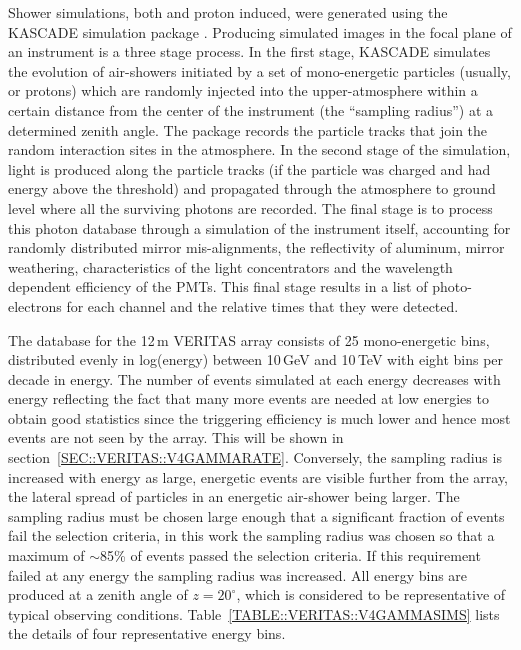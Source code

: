 Shower simulations, both \Gray and proton induced, were generated
using the KASCADE simulation package \citep{REF::KERTZMAN::1994NIMA}.
Producing simulated images in the focal plane of an instrument is a
three stage process. In the first stage, KASCADE simulates the
evolution of air-showers initiated by a set of mono-energetic
particles (usually, \Grays or protons) which are randomly injected
into the upper-atmosphere within a certain distance from the center of
the instrument (the ``sampling radius'') at a determined zenith angle.
The package records the particle tracks that join the random interaction
sites in the atmosphere. In the second stage of the simulation,
\Cerenkov light is produced along the particle tracks (if
the particle was charged and had energy above the \Cerenkov threshold)
and propagated through the atmosphere to ground level where all the
surviving photons are recorded. The final stage is to process this
photon database through a simulation of the instrument itself,
accounting for randomly distributed mirror mis-alignments, the
reflectivity of aluminum, mirror weathering, characteristics of the
light concentrators and the wavelength dependent efficiency of the
PMTs. This final stage results in a list of photo-electrons for each
channel and the relative times that they were detected.

The \Gray database for the 12\,m VERITAS array consists of 25
mono-energetic bins, distributed evenly in log(energy) between 10\,GeV
and 10\,TeV with eight bins per decade in energy. The number of events
simulated at each energy decreases with energy reflecting the fact
that many more events are needed at low energies to obtain good
statistics since the triggering efficiency is much lower and hence
most events are not seen by the array. This will be shown in
section~\ref{SEC::VERITAS::V4GAMMARATE}. Conversely, the sampling
radius is increased with energy as large, energetic events are visible
further from the array, the lateral spread of particles in an
energetic air-shower being larger. The sampling radius must be chosen
large enough that a significant fraction of events fail the selection
criteria, in this work the sampling radius was chosen so that a maximum 
of $\sim$85\% of events passed the selection criteria. If this 
requirement failed at any energy the sampling radius was increased. 
All energy bins are produced at a zenith angle of $z=20^\circ$, which 
is considered to be representative of typical observing conditions. 
Table~\ref{TABLE::VERITAS::V4GAMMASIMS} lists the details of four 
representative energy bins.

